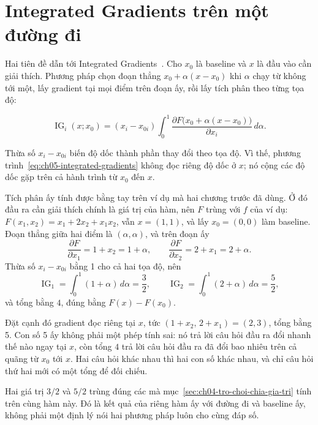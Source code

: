 \section{Integrated Gradients trên một đường đi}
\label{sec:ch05-integrated-gradients}

%
Hai tiên đề dẫn tới Integrated Gradients~\autocite{p11ig}. Cho $x_0$ là baseline và $x$ là đầu
vào cần giải thích. Phương pháp chọn đoạn thẳng $x_0+\alpha(x-x_0)$ khi
$\alpha$ chạy từ không tới một, lấy gradient tại mọi điểm trên đoạn ấy, rồi
lấy tích phân theo từng tọa độ:

\begin{equation}
\label{eq:ch05-integrated-gradients}
\operatorname{IG}_i(x;x_0)=(x_i-x_{0i})
\int_0^1 \frac{\partial F\bigl(x_0+\alpha(x-x_0)\bigr)}{\partial x_i}
\,d\alpha.
\end{equation}

Thừa số $x_i-x_{0i}$ biến độ dốc thành phần thay đổi theo tọa độ. Vì thế,
phương trình~\ref{eq:ch05-integrated-gradients} không đọc riêng độ dốc ở $x$;
nó cộng các độ dốc gặp trên cả hành trình từ $x_0$ đến $x$.

Tích phân ấy tính được bằng tay trên ví dụ mà hai chương trước đã dùng. Ở đó
đầu ra cần giải thích chính là giá trị của hàm, nên $F$ trùng với $f$ của ví dụ:
$F(x_1,x_2) = x_1 + 2x_2 + x_1x_2$, vẫn $x = (1,1)$, và lấy $x_0 = (0,0)$ làm
baseline. Đoạn thẳng giữa hai điểm là $(\alpha,\alpha)$, và trên đoạn ấy
\[
  \frac{\partial F}{\partial x_1} = 1 + x_2 = 1 + \alpha,
  \qquad
  \frac{\partial F}{\partial x_2} = 2 + x_1 = 2 + \alpha .
\]
Thừa số $x_i - x_{0i}$ bằng 1 cho cả hai tọa độ, nên
\[
  \operatorname{IG}_1 = \int_0^1 (1+\alpha)\,d\alpha = \frac{3}{2},
  \qquad
  \operatorname{IG}_2 = \int_0^1 (2+\alpha)\,d\alpha = \frac{5}{2},
\]
và tổng bằng $4$, đúng bằng $F(x) - F(x_0)$.

Đặt cạnh đó gradient đọc riêng tại $x$, tức $(1 + x_2,\, 2 + x_1) = (2,3)$, tổng
bằng 5. Con số 5 ấy không phải một phép tính sai: nó trả lời câu hỏi đầu ra đổi
nhanh thế nào ngay tại $x$, còn tổng $4$ trả lời câu hỏi đầu ra đã đổi bao nhiêu
trên cả quãng từ $x_0$ tới $x$. Hai câu hỏi khác nhau thì hai con số khác nhau,
và chỉ câu hỏi thứ hai mới có một tổng để đối chiếu.

Hai giá trị $3/2$ và $5/2$ trùng đúng các  mà
mục~\ref{sec:ch04-tro-choi-chia-gia-tri} tính trên cùng hàm này. Đó là kết quả
của riêng hàm ấy với đường đi và baseline ấy, không phải một định lý nói hai
phương pháp luôn cho cùng đáp số.


